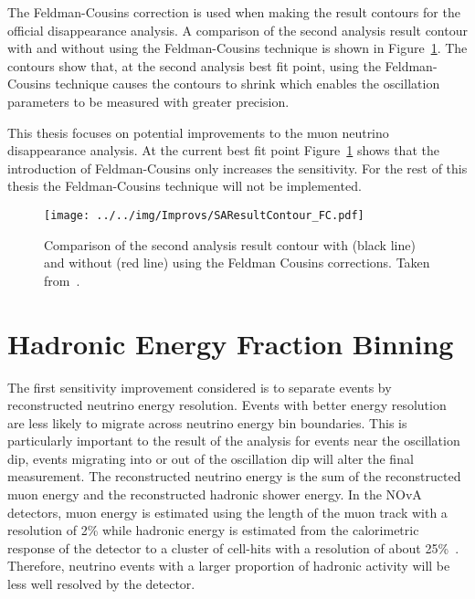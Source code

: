 The Feldman-Cousins correction is used when making the result contours
for the official disappearance analysis. 
A comparison of the second analysis result contour with and without
using the Feldman-Cousins technique is shown in
Figure~\ref{fig:SAContourFC}.
The contours show that, at the second analysis best fit point, using
the Feldman-Cousins technique causes the contours to shrink which
enables the oscillation parameters to be measured with greater
precision.

This thesis focuses on potential improvements to the muon neutrino
disappearance analysis. At the current best fit point
Figure~\ref{fig:SAContourFC} shows that the introduction of
Feldman-Cousins only increases the sensitivity.
For the rest of this thesis the Feldman-Cousins technique will not be
implemented. 


\begin{figure}
  \centering
  \texttt{[image: ../../img/Improvs/SAResultContour\_FC.pdf]}
  \caption{
    Comparison of the second analysis result contour with (black line) and
    without (red line) using the Feldman Cousins corrections. 
    Taken from~\cite{KirkFCResult}.
  } 
  \label{fig:SAContourFC}
\end{figure}


\section{Hadronic Energy Fraction Binning}\label{sec:hadEFracBinning}

The first sensitivity improvement considered is to separate events by
reconstructed neutrino energy resolution. 
Events with better energy resolution are less likely to migrate
across neutrino energy bin boundaries. This is particularly important
to the result of the analysis for events near the oscillation dip,
events migrating into or out of the oscillation dip will alter the
final measurement. 
The reconstructed neutrino energy is the sum of the reconstructed
muon energy and the reconstructed hadronic shower energy.
In the NOvA detectors, muon energy is estimated using the length of
the muon track with a resolution of 2\% while hadronic energy is
estimated from the calorimetric response of the detector to a cluster
of cell-hits with a resolution of about 25\%~\cite{NOvASA}. 
Therefore, neutrino events with a larger proportion of hadronic
activity will be less well resolved by the detector.


